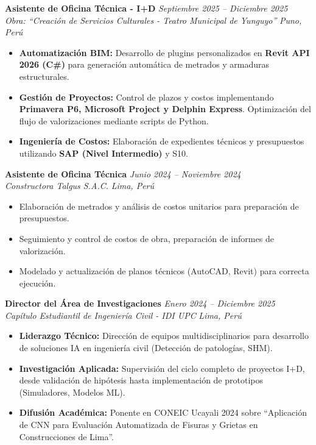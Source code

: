 \documentclass[10pt, a4paper]{article}
\newcommand{\entry}[4]{
    \textbf{#1} \hfill \textit{#2} \\
    \textit{#3} \hfill \textit{#4} \\
    \vspace{-1.5mm} 
}
\begin{document}
\entry{Asistente de Oficina Técnica - I+D}{Septiembre 2025 – Diciembre 2025}{Obra: ``Creación de Servicios Culturales - Teatro Municipal de Yunguyo''}{Puno, Perú}
\begin{itemize}
    \item \textbf{Automatización BIM:} Desarrollo de plugins personalizados en \textbf{Revit API 2026 (C\#)} para generación automática de metrados y armaduras estructurales.
    \item \textbf{Gestión de Proyectos:} Control de plazos y costos implementando \textbf{Primavera P6, Microsoft Project y Delphin Express}. Optimización del flujo de valorizaciones mediante scripts de Python.
    \item \textbf{Ingeniería de Costos:} Elaboración de expedientes técnicos y presupuestos utilizando \textbf{SAP (Nivel Intermedio)} y S10.
\end{itemize}

\vspace{2mm} 

\entry{Asistente de Oficina Técnica}{Junio 2024 – Noviembre 2024}{Constructora Talgus S.A.C.}{Lima, Perú}
\begin{itemize}
    \item Elaboración de metrados y análisis de costos unitarios para preparación de presupuestos.
    \item Seguimiento y control de costos de obra, preparación de informes de valorización.
    \item Modelado y actualización de planos técnicos (AutoCAD, Revit) para correcta ejecución.
\end{itemize}

\vspace{2mm} 

\entry{Director del Área de Investigaciones}{Enero 2024 – Diciembre 2025}{Capítulo Estudiantil de Ingeniería Civil - IDI UPC}{Lima, Perú}
\begin{itemize}
    \item \textbf{Liderazgo Técnico:} Dirección de equipos multidisciplinarios para desarrollo de soluciones IA en ingeniería civil (Detección de patologías, SHM).
    \item \textbf{Investigación Aplicada:} Supervisión del ciclo completo de proyectos I+D, desde validación de hipótesis hasta implementación de prototipos (Simuladores, Modelos ML).
    \item \textbf{Difusión Académica:} Ponente en CONEIC Ucayali 2024 sobre ``Aplicación de CNN para Evaluación Automatizada de Fisuras y Grietas en Construcciones de Lima''.
\end{itemize}
\end{document}
